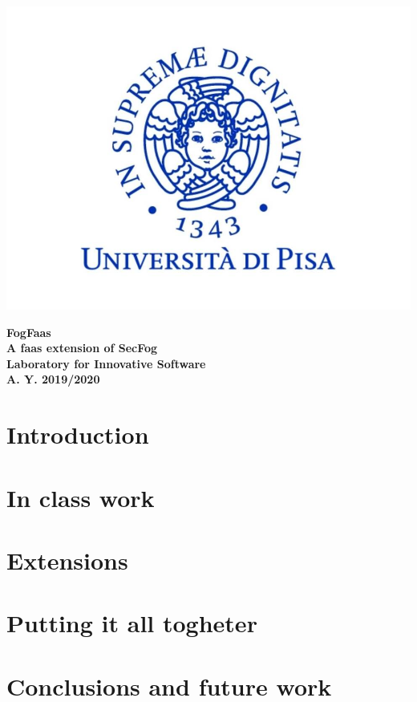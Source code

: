 \documentclass{article}
\begin{document}
\begin{titlepage}
	\begin{center}
		\includegraphics[scale=0.4]{Logo-UNIPisa.jpg} 
	\end{center}
	\begin{center}
    	{\LARGE{\bf FogFaas}}\\
    	\vspace{2.5mm}
    	{\large{\bf A faas extension of SecFog}}\\
    	\vspace{5mm}
    	{\large{\bf Laboratory for Innovative Software}}\\
    	\vspace{2.5mm}
		{\large{\bf A. Y. 2019/2020}}\\
	\end{center}
\end{titlepage}

\section{Introduction}



\section{In class work}



\section{Extensions}



\section{Putting it all togheter}



\section{Conclusions and future work}


\end{document}
